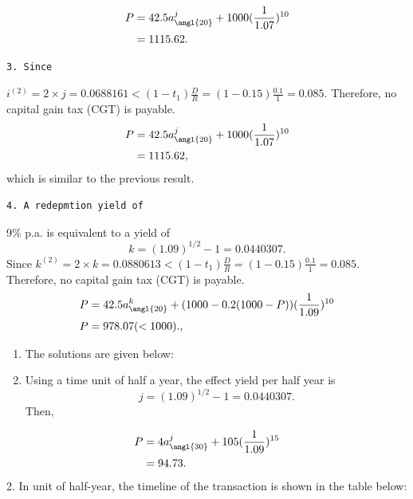 \documentclass[
]{book}
\theoremstyle{definition}
\theoremstyle{definition}
\theoremstyle{definition}
\theoremstyle{definition}
\theoremstyle{remark}
\begin{document}
\[
\begin{aligned}
P &= 42.5 a^j_{\angl{20}} + 1000 (\frac{1}{1.07})^{10} \\
&= 1115.62.
\end{aligned}
\]

\begin{verbatim}
3. Since 
\end{verbatim}

\(i^{(2)} = 2 \times j = 0.0688161 < (1 - t_1)\frac{D}{R} = (1 - 0.15)\frac{0.1}{1} = 0.085.\)
Therefore, no capital gain tax (CGT) is payable.
\[
\begin{aligned}
P &= 42.5 a^j_{\angl{20}} + 1000 (\frac{1}{1.07})^{10} \\
&= 1115.62,
\end{aligned}
\]
which is similar to the previous result.

\begin{verbatim}
4. A redepmtion yield of 
\end{verbatim}

9\% p.a. is equivalent to a yield of
\[k = (1.09)^{1/2} - 1 = 0.0440307.\]
Since \(k^{(2)} = 2 \times k = 0.0880613 < (1 - t_1)\frac{D}{R} = (1 - 0.15)\frac{0.1}{1} = 0.085.\)
Therefore, no capital gain tax (CGT) is payable.
\[
\begin{aligned}
P &= 42.5 a^k_{\angl{20}} + (1000 - 0.2(1000-P)) (\frac{1}{1.09})^{10} \\
P &= 978.07 (< 1000).,
\end{aligned}
\]

\begin{enumerate}
\def\labelenumi{\arabic{enumi}.}
\setcounter{enumi}{2}
\item
  The solutions are given below:
\item
  Using a time unit of half a year, the effect yield per half year is
  \[j = (1.09)^{1/2} - 1 = 0.0440307.\]
  Then,
\end{enumerate}

\[
\begin{aligned}
P &= 4 a^j_{\angl{30}} + 105 (\frac{1}{1.09})^{15} \\
&= 94.73.
\end{aligned}
\]
2. In unit of half-year, the timeline of the transaction is shown in the table below:
\end{document}
